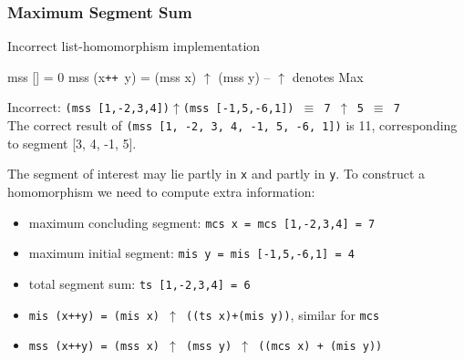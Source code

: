 \documentclass{beamer}
\renewcommand{\emph}[1]{\textcolor{structure}{#1}}
\newcommand{\mymath}[1]{$ #1 $}
\begin{document}
\begin{frame}[fragile,t]
  \frametitle{Maximum Segment Sum}

\begin{block}{Incorrect list-homomorphism implementation}
\begin{colorcode}
mss []       = 0
mss (x{\tt ++}\mbox{ }y) = (mss x) \mymath{\uparrow} (mss y) -- \mymath{\uparrow} denotes Max
\end{colorcode}
\end{block} 

\smallskip

\alert{Incorrect:} {\tt (mss [1,-2,3,4])\mymath{\uparrow}(mss [-1,5,-6,1]) $\equiv$ 7 \mymath{\uparrow} 5 $\equiv$ 7} \\
\emph{The correct result} of {\tt (mss [1, -2, 3, 4, -1, 5, -6, 1])} \emph{is} 11, corresponding to segment [3, 4, -1, 5].

\bigskip

\emph{The segment of interest may lie partly in {\tt x} and partly in {\tt y}.} 
To construct a homomorphism we need to compute extra information:\pause
\begin{itemize}
    \item maximum concluding segment: {\tt mcs x = mcs [1,-2,3,4] = 7}
    \item maximum initial segment: {\tt mis y = mis [-1,5,-6,1] = 4}
    \item total segment sum: {\tt ts [1,-2,3,4] = 6}\pause
    \item {\tt mis (x++y) = (mis x) $\uparrow$ ((ts x)+(mis y))}, similar for {\tt mcs}    
    \item {\tt mss (x++y) = (mss x) $\uparrow$ (mss y) $\uparrow$ ((mcs x) + (mis y))}
\end{itemize}
\end{frame}
\end{document}

